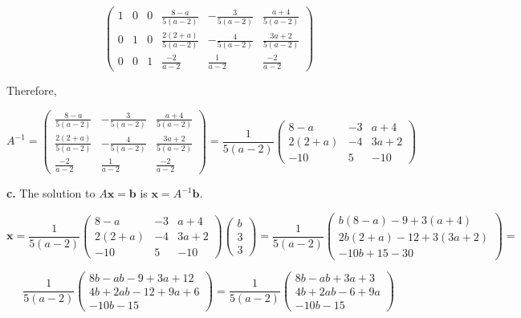\documentclass{article}
\begin{document}
\begin{equation*}
  \begin{pmatrix}
    1 & 0 & 0 & \frac{8-a}{5(a-2)} & -\frac{3}{5(a-2)} & \frac{a+4}{5(a-2)}\\
    0 & 1 &  0 & \frac{2(2+a)}{5(a-2)} & -\frac{4}{5(a-2)} & \frac{3a+2}{5(a-2)} \\
    0 & 0 &  1 & \frac{-2}{a-2} & \frac{1}{a-2} & \frac{-2}{a-2}
  \end{pmatrix}
\end{equation*}

Therefore,

\begin{equation*}
  A^{-1} = \begin{pmatrix}
    \frac{8-a}{5(a-2)} & -\frac{3}{5(a-2)} & \frac{a+4}{5(a-2)}\\
    \frac{2(2+a)}{5(a-2)} & -\frac{4}{5(a-2)} & \frac{3a+2}{5(a-2)} \\
    \frac{-2}{a-2} & \frac{1}{a-2} & \frac{-2}{a-2}
  \end{pmatrix}
   = \frac{1}{5(a-2)} \begin{pmatrix}
    8-a & -3 & a + 4\\
    2(2+a) & -4 & 3a+2 \\
     -10 & 5 & -10
  \end{pmatrix}
\end{equation*}

\textbf{c.} The solution to $A\mathbf{x} = \mathbf{b}$ is $\mathbf{x} = A^{-1}\mathbf{b}$.

\begin{equation*}
  \mathbf{x} = \frac{1}{5(a-2)} \begin{pmatrix}
    8-a & -3 & a + 4\\
    2(2+a) & -4 & 3a+2 \\
     -10 & 5 & -10
  \end{pmatrix} \begin{pmatrix} b \\ 3 \\ 3  \end{pmatrix} = \frac{1}{5(a-2)}\begin{pmatrix}
    b(8-a) - 9 + 3(a+4) \\
    2b(2+a) - 12 + 3(3a+2) \\
    -10b + 15 - 30
  \end{pmatrix} =
\end{equation*}

\begin{equation*}
   \frac{1}{5(a-2)}
  \begin{pmatrix}
    8b - ab - 9 + 3a + 12 \\
    4b + 2ab - 12 + 9a + 6 \\
    -10b - 15
  \end{pmatrix}  =
  \frac{1}{5(a-2)}
  \begin{pmatrix}
    8b - ab + 3a + 3 \\
    4b + 2ab - 6 + 9a \\
    -10b - 15
  \end{pmatrix}
\end{equation*}
\end{document}
